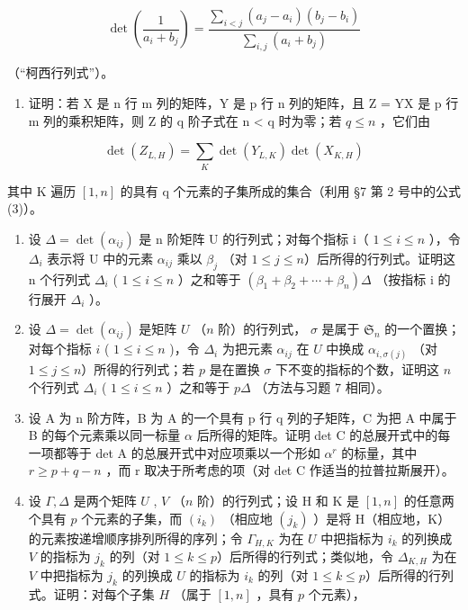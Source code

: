 \[
\det \left(\frac {1}{a _ {i} + b _ {j}}\right) = \frac {\sum_ {i <   j} (a _ {j} - a _ {i}) (b _ {j} - b _ {i})}{\sum_ {i , j} (a _ {i} + b _ {j})}
\]

（“柯西行列式”）。

\begin{enumerate}
\def\labelenumi{\arabic{enumi}.}
\setcounter{enumi}{5}
\tightlist
\item
  证明：若 X 是 n 行 m 列的矩阵，Y 是 p 行 n 列的矩阵，且 Z = YX 是 p 行 m 列的乘积矩阵，则 Z 的 q 阶子式在 n \textless{} q 时为零；若 \(q \leqslant n\) ，它们由
\end{enumerate}

\[
\det (Z _ {L, H}) = \sum_ {K} \det (Y _ {L, K}) \det (X _ {K, H})
\]

其中 K 遍历 \([1, n]\) 的具有 q 个元素的子集所成的集合（利用 §7 第 2 号中的公式 (3)）。

\begin{enumerate}
\def\labelenumi{\arabic{enumi}.}
\setcounter{enumi}{6}
\item
  设 \(\Delta = \det(\alpha_{ij})\) 是 n 阶矩阵 U 的行列式；对每个指标 i（ \(1 \leqslant i \leqslant n\) ），令 \(\Delta_i\) 表示将 U 中的元素 \(\alpha_{ij}\) 乘以 \(\beta_j\) （对 \(1 \leqslant j \leqslant n\)）后所得的行列式。证明这 n 个行列式 \(\Delta_i\) ( \(1 \leqslant i \leqslant n\) ）之和等于 \((\beta_1 + \beta_2 + \cdots + \beta_n)\Delta\) （按指标 i 的行展开 \(\Delta_i\) ）。
\item
  设 \(\Delta = \det(\alpha_{ij})\) 是矩阵 \(U\) （\(n\) 阶）的行列式， \(\sigma\) 是属于 \(\mathfrak{S}_n\) 的一个置换；对每个指标 \(i\) ( \(1 \leqslant i \leqslant n\) )，令 \(\Delta_i\) 为把元素 \(\alpha_{ij}\) 在 \(U\) 中换成 \(\alpha_{i,\sigma(j)}\) （对 \(1 \leqslant j \leqslant n\)）所得的行列式；若 \(p\) 是在置换 \(\sigma\) 下不变的指标的个数，证明这 \(n\) 个行列式 \(\Delta_i\) ( \(1 \leqslant i \leqslant n\) ）之和等于 \(p\Delta\) （方法与习题 7 相同）。
\item
  设 A 为 n 阶方阵，B 为 A 的一个具有 p 行 q 列的子矩阵，C 为把 A 中属于 B 的每个元素乘以同一标量 \(\alpha\) 后所得的矩阵。证明 det C 的总展开式中的每一项都等于 det A 的总展开式中对应项乘以一个形如 \(\alpha^{r}\) 的标量，其中 \(r \geqslant p + q - n\) ，而 r 取决于所考虑的项（对 det C 作适当的拉普拉斯展开）。
\item
  设 \(\Gamma, \Delta\) 是两个矩阵 \(U\) , \(V\) （\(n\) 阶）的行列式；设 H 和 K 是 \([1, n]\) 的任意两个具有 \(p\) 个元素的子集，而 \((i_k)\) （相应地 \((j_k)\) ）是将 H（相应地，K）的元素按递增顺序排列所得的序列；令 \(\Gamma_{H,K}\) 为在 \(U\) 中把指标为 \(i_k\) 的列换成 \(V\) 的指标为 \(j_k\) 的列（对 \(1 \leqslant k \leqslant p\)）后所得的行列式；类似地，令 \(\Delta_{K,H}\) 为在 \(V\) 中把指标为 \(j_k\) 的列换成 \(U\) 的指标为 \(i_k\) 的列（对 \(1 \leqslant k \leqslant p\)）后所得的行列式。证明：对每个子集 \(H\) （属于 \([1, n]\) ，具有 \(p\) 个元素），
\end{enumerate}


